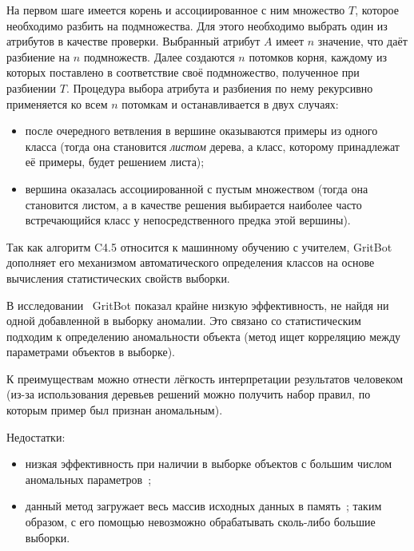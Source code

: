 На первом шаге имеется корень и ассоциированное с ним множество $T$, которое необходимо разбить на подмножества. Для этого необходимо выбрать один из атрибутов в качестве проверки. Выбранный атрибут $A$ имеет $n$ значение, что даёт разбиение на $n$ подмножеств. Далее создаются $n$ потомков корня, каждому из которых поставлено в соответствие своё подмножество, полученное при разбиении $T$. Процедура выбора атрибута и разбиения по нему рекурсивно применяется ко всем $n$ потомкам и останавливается в двух случаях:
\begin{itemize}
	\item после очередного ветвления в вершине оказываются примеры из одного класса (тогда она становится \textit{листом} дерева, а класс, которому принадлежат её примеры, будет решением листа);
	\item вершина оказалась ассоциированной с пустым множеством (тогда она становится листом, а в качестве решения выбирается наиболее часто встречающийся класс у непосредственного предка этой вершины).
\end{itemize}

Так как алгоритм C4.5 относится к машинному обучению с учителем, GritBot дополняет его механизмом автоматического определения классов на основе вычисления статистических свойств выборки.

В исследовании~\cite{MLInCyberTrust} GritBot показал крайне низкую эффективность, не найдя ни одной добавленной в выборку аномалии. Это связано со статистическим подходим к определению аномальности объекта (метод ищет корреляцию между параметрами объектов в выборке). 

К преимуществам можно отнести лёгкость интерпретации результатов человеком (из-за использования деревьев решений можно получить набор правил, по которым пример был признан аномальным).

Недостатки:
\begin{itemize}
	\item низкая эффективность при наличии в выборке объектов с большим числом аномальных параметров~\cite{MLInCyberTrust};
	\item данный метод загружает весь массив исходных данных в память~\cite{BaySchwabacherOrca}; таким образом, с его помощью невозможно обрабатывать сколь-либо большие выборки.
\end{itemize}